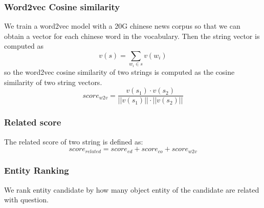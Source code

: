 \documentclass{llncs}
\begin{document}
\subsubsection{Word2vec Cosine similarity}
We train a word2vec model with a 20G chinese news corpus so that we can obtain a 
vector for each chinese word in the vocabulary. Then the string vector is 
computed as
\begin{equation}
    v(s) = \sum_{w_i \in s}{v(w_i)}
  \end{equation}
so the word2vec cosine similarity of two strings is computed as the cosine 
similarity of two string vectors.
\begin{equation}
    score_{w2v} = \frac{v(s_1) \cdot v(s_2)}{||v(s_1)|| \cdot ||v(s_2)||}
  \end{equation}

\subsubsection{Related score}
The related score of two string is defined as:
\begin{equation}
    score_{related} = score_{ed} + score_{co} + score_{w2v}
  \end{equation}

\subsubsection{Entity Ranking}
We rank entity candidate by how many object entity of the candidate are related 
with question.
\end{document}
